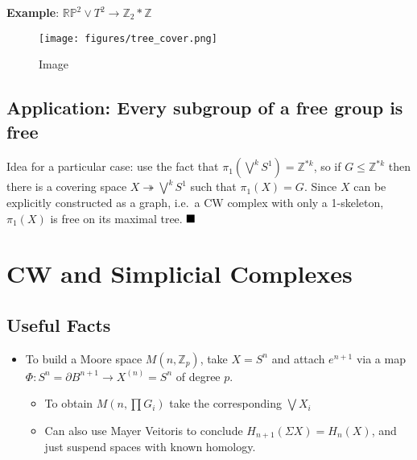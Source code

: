 \textbf{Example}:
\({\mathbb{RP}}^2 \vee T^2 \to {\mathbb{Z}}_2 \ast {\mathbb{Z}}\)

\begin{figure}
\centering
\texttt{[image: figures/tree\_cover.png]}
\caption{Image}
\end{figure}

\hypertarget{application-every-subgroup-of-a-free-group-is-free}{%
\subsection{Application: Every subgroup of a free group is
free}\label{application-every-subgroup-of-a-free-group-is-free}}

Idea for a particular case: use the fact that
\(\pi_1(\bigvee^k S^1) = {\mathbb{Z}}^{\ast k}\), so if
\(G \leq {\mathbb{Z}}^{\ast k}\) then there is a covering space
\(X \twoheadrightarrow\bigvee^k S^1\) such that \(\pi_1(X) = G\). Since
\(X\) can be explicitly constructed as a graph, i.e.~a CW complex with
only a 1-skeleton, \(\pi_1(X)\) is free on its maximal tree.
\(\hfill\blacksquare\)

\hypertarget{cw-and-simplicial-complexes}{%
\section{CW and Simplicial
Complexes}\label{cw-and-simplicial-complexes}}

\hypertarget{useful-facts-1}{%
\subsection{Useful Facts}\label{useful-facts-1}}

\begin{itemize}
\tightlist
\item
  To build a Moore space \(M(n, {\mathbb{Z}}_p)\), take \(X = S^n\) and
  attach \(e^{n+1}\) via a map
  \(\Phi: S^n = {\partial}B^{n+1}\to X^{(n)} = S^n\) of degree \(p\).

  \begin{itemize}
  \tightlist
  \item
    To obtain \(M(n, \prod G_i)\) take the corresponding \(\bigvee X_i\)
  \item
    Can also use Mayer Veitoris to conclude
    \(H_{n+1}(\Sigma X) = H_n(X)\), and just suspend spaces with known
    homology.
  \end{itemize}
\end{itemize}

